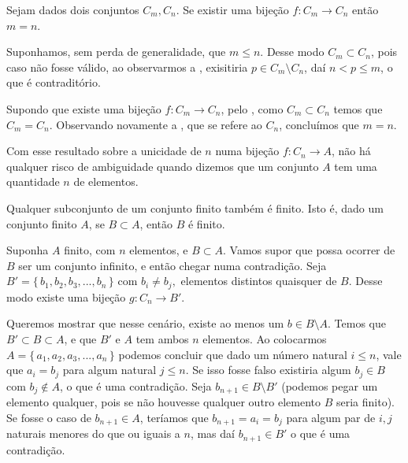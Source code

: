 \documentclass[../main.tex]{subfiles}
\begin{document}
\begin{teo}
    Sejam dados dois conjuntos $C_m, C_n$. Se existir uma bijeção $f \colon C_m \to C_n$ então $m=n$.
\end{teo}
\begin{dem}
    Suponhamos, sem perda de generalidade, que $m \leq n$. Desse modo $C_m \subset C_n$, pois caso não fosse válido, ao observarmos a , exisitiria $p \in C_m \setminus C_n$, daí $n < p \leq m$, o que é contraditório.

    Supondo que existe uma bijeção $f \colon C_m \to C_n$, pelo , como $C_m \subset C_n$ temos que $C_m = C_n$. Observando novamente a , que se refere ao $C_n$, concluímos que $m=n$.
\end{dem}

Com esse resultado sobre a unicidade de $n$ numa bijeção $f: C_n \to A$, não há qualquer risco de ambiguidade quando dizemos que um conjunto $A$ tem uma quantidade $n$ de elementos.

\begin{teo}\label{enum-teo-subconjuntoDeConjuntoFinitoFinito}
    Qualquer subconjunto de um conjunto finito também é finito. Isto é, dado um conjunto finito $A$, se $B \subset A$, então $B$ é finito. 
\end{teo}
\begin{dem}
    Suponha $A$ finito, com $n$ elementos, e $B \subset A$.
    Vamos supor que possa ocorrer de $B$ ser um conjunto infinito, e então chegar numa contradição.
    Seja $B' = \{\,b_1, b_2, b_3, ..., b_n\,\}$ com $b_i \neq b_j,$ elementos distintos quaisquer de $B$. Desse modo existe uma bijeção $g \colon C_n \to B'$. 
    
    Queremos mostrar que nesse cenário, existe ao menos um $b \in B \setminus A$. 
    Temos que $B' \subset B \subset A$, e que $B'$ e $A$ tem ambos $n$ elementos. Ao colocarmos $A = \{\,a_1,a_2,a_3,...,a_n\,\}$ podemos concluir que dado um número natural $i \leq n$, vale que $a_i = b_j$ para algum natural $j \leq n$. Se isso fosse falso existiria algum $b_j \in B$ com $b_j \not\in A$, o que é uma contradição. Seja $b_{n+1} \in B \setminus B'$ (podemos pegar um elemento qualquer, pois se não houvesse qualquer outro elemento $B$ seria finito). Se fosse o caso de $b_{n+1} \in A$, teríamos que $b_{n+1} = a_i = b_j$ para algum par de $i,j$ naturais menores do que ou iguais a $n$, mas daí $b_{n+1} \in B'$ o que é uma contradição.    
\end{dem}
\end{document}
